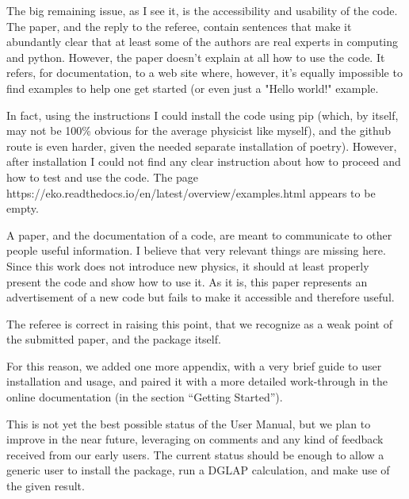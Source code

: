 \documentclass[a4paper,11pt]{article}
\newcounter{comment}[section]
\begin{document}
\begin{response}{
  The big remaining issue, as I see it, is the accessibility and usability of
  the code. The paper, and the reply to the referee, contain sentences that
  make it abundantly clear that at least some of the authors are real experts
  in computing and python. However, the paper doesn't explain at all how to use
  the code. It refers, for documentation,  to a web site where, however, it's
  equally impossible to find examples to help one  get started (or even just a
  "Hello world!" example.

  In fact, using the instructions I could install the code using pip (which, by
  itself, may not be 100\% obvious for the average physicist like myself), and
  the github route is even harder, given the needed separate installation of
  poetry). However, after installation I could not find any clear instruction
  about how to proceed and how to test and use the code. The page
  https://eko.readthedocs.io/en/latest/overview/examples.html appears to be
  empty.

  A paper, and the documentation of a code, are meant to communicate to other
  people useful information. I believe that very relevant things are missing
  here. Since this work does not introduce new physics, it should at least
  properly present the code and show how to use it. As it is, this paper
  represents an advertisement of a new code but fails to make it accessible and
  therefore useful.
}

The referee is correct in raising this point, that we recognize as a weak point
of the submitted paper, and the \eko{} package itself.

For this reason, we added one more appendix, with a very brief guide to user
installation and usage, and paired it with a more detailed work-through in the
online documentation (in the section \enquote{Getting Started}).

This is not yet the best possible status of the User Manual, but we plan to
improve in the near future, leveraging on comments and any kind of feedback
received from our early users.
The current status should be enough to allow a generic user to install the
package, run a DGLAP calculation, and make use of the given result.
\end{response}
\end{document}
